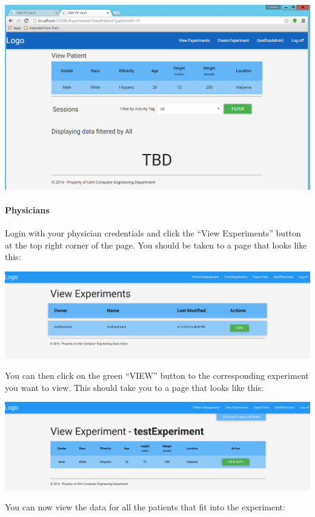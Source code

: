 \documentclass[letterpaper,10pt,english]{sphinxmanual}
\begin{document}
\includegraphics{view_experiments_expadmin_2.png}


\paragraph{Physicians}
\label{user_guide/experiment_view:physicians}
Login with your physician credentials and click the ``View Experiments'' button at the top right corner of the page.
You should be taken to a page that looks like this:

\includegraphics{view_experiments_physician.png}

You can then click on the green ``VIEW'' button to the corresponding experiment you want to view. This should take you
to a page that looks like this:

\includegraphics{view_experiments_physician_2.png}

You can now view the data for all the patients that fit into the experiment:
\end{document}
